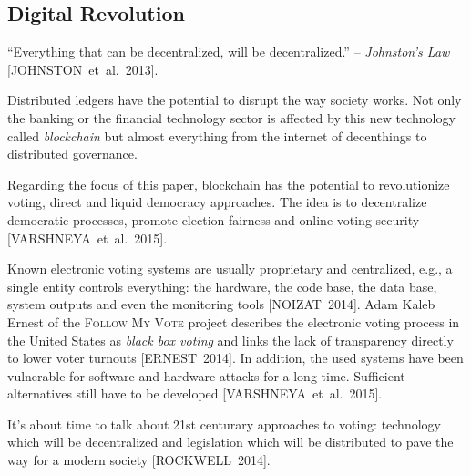 \documentclass[9pt,oneside]{amsart}
\begin{document}
\setlength{\columnsep}{20pt}
\begin{multicols}{2}

\section{Digital Revolution}\label{sec:motivation}


\enquote{Everything that can be decentralized, will be decentralized.} -- \textit{Johnston's Law} [JOHNSTON~et~al.~2013].\par
Distributed ledgers have the potential to disrupt the way society works. Not only the banking or the financial technology sector is affected by this new technology called \textit{blockchain} but almost everything from the internet of decenthings to distributed governance.\par
Regarding the focus of this paper, blockchain has the potential to revolutionize voting, direct and liquid democracy approaches. The idea is to decentralize democratic processes, promote election fairness and online voting security [VARSHNEYA~et~al.~2015].\par
Known electronic voting systems are usually proprietary and centralized, e.g., a single entity controls everything: the hardware, the code base, the data base, system outputs and even the monitoring tools [NOIZAT~2014]. Adam Kaleb Ernest of the \textsc{Follow My Vote} project describes the electronic voting process in the United States as \textit{black box voting} and links the lack of transparency directly to lower voter turnouts [ERNEST~2014]. In addition, the used systems have been vulnerable for software and hardware attacks for a long time. Sufficient alternatives still have to be developed [VARSHNEYA~et~al.~2015].\par
It's about time to talk about 21st centurary approaches to voting: technology which will be decentralized and legislation which will be distributed to pave the way for a modern society [ROCKWELL~2014].


\end{multicols}
\end{document}
